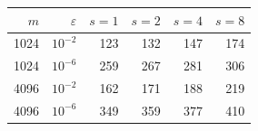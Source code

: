 \begin{tabular}{@{}rrrrrr@{}}
\toprule
$m$ & $\varepsilon$ & $s=1$ & $s=2$ & $s=4$ & $s=8$ \\
\midrule
1024 & $10^{-2}$ & 123 & 132 & 147 & 174 \\
1024 & $10^{-6}$ & 259 & 267 & 281 & 306 \\
4096 & $10^{-2}$ & 162 & 171 & 188 & 219 \\
4096 & $10^{-6}$ & 349 & 359 & 377 & 410 \\
\bottomrule
\end{tabular}
